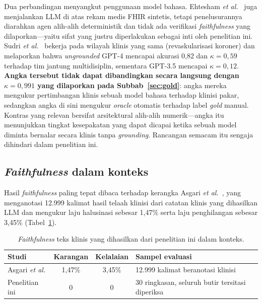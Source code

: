 Dua perbandingan menyangkut penggunaan model bahasa. Ehtesham
\textit{et al.}~\cite{ehtesham2025} juga menjalankan LLM di atas rekam medis FHIR sintetis,
tetapi penelusurannya diarahkan agen alih-alih deterministik dan tidak ada
verifikasi \emph{faithfulness} yang dilaporkan---yaitu sifat yang justru diperlakukan sebagai
inti oleh penelitian ini. Sudri \textit{et al.}~\cite{sudri2024} bekerja pada wilayah klinis
yang sama (revaskularisasi koroner) dan melaporkan bahwa \emph{ungrounded} GPT-4 mencapai
akurasi 0,82 dan $\kappa = 0{,}59$ terhadap tim jantung
multidisiplin, sementara GPT-3.5 mencapai $\kappa = 0{,}12$.
\textbf{Angka tersebut tidak dapat dibandingkan secara langsung dengan
$\kappa = 0{,}991$ yang dilaporkan pada Subbab~\ref{sec:gold}}: angka mereka
mengukur pertimbangan klinis sebuah model bahasa terhadap klinisi pakar, sedangkan angka di
sini mengukur \emph{oracle} otomatis terhadap label \emph{gold} manual. Kontras yang relevan
bersifat arsitektural alih-alih numerik---angka itu menunjukkan tingkat kesepakatan yang dapat
dicapai ketika sebuah model diminta bernalar secara klinis tanpa \emph{grounding}. Rancangan semacam itu sengaja dihindari dalam penelitian ini.

\subsection{\emph{Faithfulness} dalam konteks}

Hasil \emph{faithfulness} paling tepat dibaca terhadap kerangka Asgari
\textit{et al.}~\cite{asgari2025}, yang menganotasi 12.999 kalimat hasil telaah
klinisi dari catatan klinis yang dihasilkan LLM dan mengukur laju halusinasi sebesar
1,47\% serta laju penghilangan sebesar 3,45\%
(Tabel~\ref{tab:faithful-compare}).

\begin{table}[h]
\centering
\caption{\emph{Faithfulness} teks klinis yang dihasilkan dari penelitian ini dalam konteks.}
\label{tab:faithful-compare}
\footnotesize
\begin{tabular}{lccl}
\hline
\textbf{Studi} & \textbf{Karangan} & \textbf{Kelalaian} & \textbf{Sampel evaluasi} \\
\hline
Asgari \textit{et al.} \cite{asgari2025}
  & 1,47\% & 3,45\%
  & 12.999 kalimat beranotasi klinisi \\
Penelitian ini
  & 0 & 0
  & 30 ringkasan, seluruh butir tersitasi diperiksa \\
\hline
\end{tabular}

\vspace{2pt}
\end{table}

